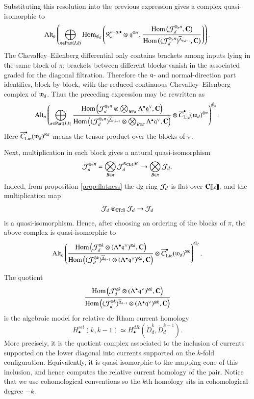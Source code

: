 \documentclass[main.tex]{subfiles}
\begin{document}
Substituting this resolution into the previous expression gives a complex quasi-isomorphic to
\[
\operatorname{Alt}_n
\left(
\bigoplus_{\pi\in \operatorname{Part}(I,k)}
\operatorname{Hom}_{\mathfrak{gl}_d}
\left(
\mathfrak K^{n-q,\bullet}_\pi\otimes \mathfrak{q}^{\otimes n},
\,
\frac{
\operatorname{Hom}\big(\mathcal J_d^{\otimes_\pi n},\mathbf{C}\big)}
{
\operatorname{Hom}\big((\mathcal J_d^{\otimes_\pi n})^{\widehat\Delta_{\pi,k-1}},\mathbf{C}\big)}
\right)
\right).
\]
The Chevalley--Eilenberg differential only contains brackets among inputs lying in the same block of $\pi$; brackets between different blocks vanish in the associated graded for the diagonal filtration. Therefore the $\mathfrak{q}$- and normal-direction part identifies, block by block, with the reduced continuous Chevalley--Eilenberg complex of $\mathfrak{w}_d$. Thus the preceding expression may be rewritten as
\[
\operatorname{Alt}_n
\left(
\bigoplus_{\pi\in \operatorname{Part}(I,k)}
\frac{
\operatorname{Hom}
\left(
\mathcal J_d^{\otimes_\pi n}\otimes
\bigotimes_{B\in\pi}\Lambda^\bullet \mathfrak{q}^\vee,
\mathbf{C}
\right)}
{
\operatorname{Hom}
\left(
(\mathcal J_d^{\otimes_\pi n})^{\widehat\Delta_{\pi,k-1}}\otimes
\bigotimes_{B\in\pi}\Lambda^\bullet \mathfrak{q}^\vee,
\mathbf{C}
\right)}
\otimes
\overline C^\bullet_{\mathrm{Lie}}(\mathfrak{w}_d)^{\otimes \pi}
\right)^{\mathfrak{gl}_d}.
\]
Here $\overline C^\bullet_{\mathrm{Lie}}(\mathfrak{w}_d)^{\otimes \pi}$ means the tensor product over the blocks of $\pi$.

Next, multiplication in each block gives a natural quasi-isomorphism
\[
  \mathcal J_d^{\otimes_\pi n}
  =
  \bigotimes_{B\in\pi}
  \mathcal J_d^{\otimes_{\mathbf{C}\llbracket z\rrbracket}|B|}
  \to
  \bigotimes_{B\in\pi}\mathcal J_d.
\]
Indeed, from proposition \ref{prop:flatness} the dg ring $\mathcal J_d$ is flat over $\mathbf{C}\llbracket z\rrbracket$, and the multiplication map
\[
  \mathcal J_d\otimes_{\mathbf{C}\llbracket z\rrbracket}\mathcal J_d
  \to
  \mathcal J_d
\]
is a quasi-isomorphism.
Hence, after choosing an ordering of the blocks of $\pi$, the above complex is quasi-isomorphic to
\[
\operatorname{Alt}_k
\left(
\frac{
\operatorname{Hom}
\left(
\mathcal J_d^{\otimes k}\otimes (\Lambda^\bullet\mathfrak{q}^\vee)^{\otimes k},
\mathbf{C}
\right)}
{
\operatorname{Hom}
\left(
(\mathcal J_d^{\otimes k})^{\widehat\Delta_{k-1}}\otimes
(\Lambda^\bullet\mathfrak{q}^\vee)^{\otimes k},
\mathbf{C}
\right)}
\otimes
\overline C^\bullet_{\mathrm{Lie}}(\mathfrak{w}_d)^{\otimes k}
\right)^{\mathfrak{gl}_d}.
\]

The quotient
\[
  \frac{
\operatorname{Hom}
\left(
\mathcal J_d^{\otimes k}\otimes (\Lambda^\bullet\mathfrak{q}^\vee)^{\otimes k},
\mathbf{C}
\right)}
{
\operatorname{Hom}
\left(
(\mathcal J_d^{\otimes k})^{\widehat\Delta_{k-1}}\otimes
(\Lambda^\bullet\mathfrak{q}^\vee)^{\otimes k},
\mathbf{C}
\right)}
\]
is the algebraic model for relative de Rham current homology
\[
  H^{rel}_\bullet(k,k-1)
  \simeq
  H^{dR}_\bullet
  \left(
  \mathring D_d^k,
  \mathring D_d^{k-1}
  \right).
\]
More precisely, it is the quotient complex associated to the inclusion of currents supported on the lower diagonal into currents supported on the $k$-fold configuration. Equivalently, it is quasi-isomorphic to the mapping cone of this inclusion, and hence computes the relative current homology of the pair.
Notice that we use cohomological conventions so the $k$th homology sits in cohomological degree $-k$.
\end{document}

